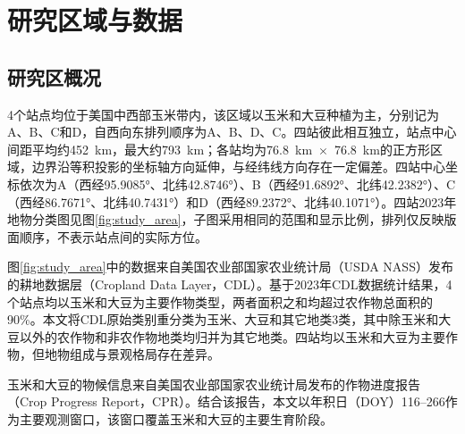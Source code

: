 
\section{研究区域与数据}

\subsection{研究区概况}

4个站点均位于美国中西部玉米带内，该区域以玉米和大豆种植为主，分别记为A、B、C和D，自西向东排列顺序为A、B、D、C。四站彼此相互独立，站点中心间距平均约452~km，最大约793~km；各站均为76.8~km~$\times$~76.8~km的正方形区域，边界沿等积投影的坐标轴方向延伸，与经纬线方向存在一定偏差。四站中心坐标依次为A（西经95.9085°、北纬42.8746°）、B（西经91.6892°、北纬42.2382°）、C（西经86.7671°、北纬40.7431°）和D（西经89.2372°、北纬40.1071°）。四站2023年地物分类图见图\ref{fig:study_area}，子图采用相同的范围和显示比例，排列仅反映版面顺序，不表示站点间的实际方位。

图\ref{fig:study_area}中的数据来自美国农业部国家农业统计局（USDA NASS）发布的耕地数据层（Cropland Data Layer，CDL）。基于2023年CDL数据统计结果，4个站点均以玉米和大豆为主要作物类型，两者面积之和均超过农作物总面积的90\%。本文将CDL原始类别重分类为玉米、大豆和其它地类3类，其中除玉米和大豆以外的农作物和非农作物地类均归并为其它地类。四站均以玉米和大豆为主要作物，但地物组成与景观格局存在差异。

玉米和大豆的物候信息来自美国农业部国家农业统计局发布的作物进度报告（Crop Progress Report，CPR）。结合该报告，本文以年积日（DOY）116–266作为主要观测窗口，该窗口覆盖玉米和大豆的主要生育阶段。

